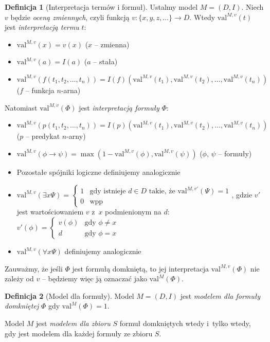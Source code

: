 \documentclass[10pt,a4paper]{article}
\theoremstyle{plain}
\theoremstyle{definition}
\newtheorem*{definition}{Definicja}
\newcommand{\impl}{\rightarrow}
\begin{document}
\begin{definition}[Interpretacja termów i formuł]
  Ustalmy model $M=(D,I)$.  Niech $v$ będzie \emph{oceną zmiennych},
  czyli funkcją $v : \lbrace x, y, z,\ldots \rbrace \rightarrow D$.
  Wtedy $\text{val}^{M,v}(t)$ jest \emph{interpretacją termu} $t$:
  \begin{itemize}
    \item $\text{val}^{M,v}(x) = v(x)$ ($x$ -- zmienna)
    \item $\text{val}^{M,v}(a) = I(a)$ ($a$ -- stała)
    \item $\text{val}^{M,v}(f(t_1,t_2,\ldots,t_n)) =
      I(f)(\text{val}^{M,v}(t_1), \mathrm{val}^{M,v}(t_2), \ldots,
      \text{val}^{M,v}(t_n))$ ($f$ -- funkcja $n$-arna)
  \end{itemize}
  Natomiast $\text{val}^{M,v}(\Phi)$ jest \emph{interpretacją formuły} $\Phi$:
  \begin{itemize}
    \item $\text{val}^{M,v}(p(t_1,t_2,\ldots,t_n)) =
      I(p)(\text{val}^{M,v}(t_1), \mathrm{val}^{M,v}(t_2), \ldots,
      \text{val}^{M,v}(t_n))$ ($p$ -- predykat $n$-arny)
    \item $\text{val}^{M,v}(\phi \impl \psi) =
      \max(1 - \text{val}^{M,v}(\phi), \mathrm{val}^{M,v}(\psi))$
      ($\phi$, $\psi$ -- formuły)
    \item Pozostałe spójniki logiczne definiujemy analogicznie
    \item $\text{val}^{M,v}(\exists x \Psi) = \begin{cases}
        1 & \text{gdy istnieje } d \in D \text{ takie, że }
        \text{val}^{M,v'}(\Psi) = 1 \\
        0 & \text{wpp}
      \end{cases}$, gdzie $v'$ jest wartościowaniem $v$ z~$x$ podmienionym
      na $d$: $v'(\phi) = \begin{cases} v(\phi) & \text{gdy } \phi \ne x \\
      d & \text{gdy } \phi = x \end{cases}$
    \item $\text{val}^{M,v}(\forall x \Psi)$ definiujemy analogicznie
  \end{itemize}

  Zauważmy, że jeśli $\Phi$ jest formułą domkniętą, to jej interpretacja
  $\text{val}^{M,v}(\Phi)$ nie zależy od $v$ -- będziemy więc ją oznaczać
  jako $\text{val}^{M}(\Phi)$.
\end{definition}

\begin{definition}[Model dla formuły]
  Model $M=(D,I)$ jest \emph{modelem dla formuły domkniętej} $\Phi$ gdy
  $\text{val}^M(\Phi) = 1$.
  
  Model $M$ jest \emph{modelem dla zbioru} $S$ formuł domkniętych wtedy i~tylko wtedy,
  gdy jest modelem dla każdej formuły ze zbioru $S$.
\end{definition}
\end{document}
